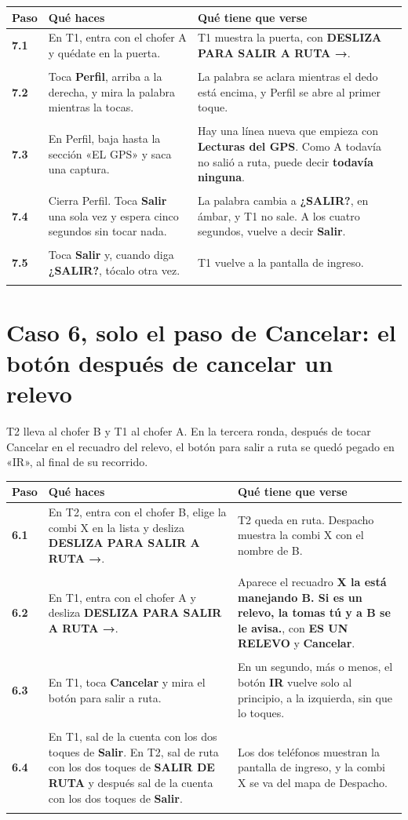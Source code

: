 \documentclass[10pt,a4paper]{article}
\makeatletter
\newcommand{\toca}[1]{\textcolor{azul}{\textbf{#1}}}
\newcommand{\pantalla}[1]{\textcolor{marron}{\textbf{#1}}}
\newcommand{\caja}[2]{\hbox{\vrule height #1 depth 0pt width 0pt #2}}
\newcommand{\campo}[3]{%
  \raisebox{-0.35\height}{\caja{#3}{\TextField[name=#1, width=#2, height=#3, charsize=8pt, bordercolor={0.55 0.6 0.68},
    backgroundcolor={0.965 0.976 0.992}, multiline=true]{}}}}
\newcommand{\resultado}[1]{%
  \caja{9pt}{\ChoiceMenu[radio, name=resultado-#1, width=9pt, height=9pt, radiosymbol=l,
    bordercolor={0.35 0.38 0.45}, default=]{}{OK=ok,FALLA=falla,NO SE PUDO=nopudo}}}
\newcommand{\paso}[4]{%
  \textbf{#1} & #3 & #4 \\*
  \multicolumn{3}{@{\hspace{6pt}}l@{}}{\rule{0pt}{15pt}\small
    \resultado{#2}\hspace{0.4em}Hora:~\campo{hora-#2}{1.7cm}{13pt}\hspace{1.2em}Nota:~\campo{nota-#2}{8.3cm}{22pt}}\\[3pt]
  \hline
}
\newenvironment{pasos}{%
  \begin{longtable}{@{\hspace{6pt}}>{\raggedright\arraybackslash}p{0.9cm}>{\raggedright\arraybackslash}p{7.9cm}>{\raggedright\arraybackslash}p{7.3cm}@{}}
  \rowcolor{cabecera}\textbf{Paso} & \textbf{Qué haces} & \textbf{Qué tiene que verse} \\ \hline
  \endhead
}{\end{longtable}\vspace{-0.6em}}
\makeatother
\begin{document}
\begin{Form}
\begin{pasos}
\paso{7.1}{7-1}{En T1, entra con el chofer A y quédate en la puerta.}{T1 muestra la puerta, con \pantalla{DESLIZA PARA SALIR A RUTA →}.}
\paso{7.2}{7-2}{Toca \toca{Perfil}, arriba a la derecha, y mira la palabra mientras la tocas.}{La palabra se aclara mientras el dedo está encima, y Perfil se abre al primer toque.}
\paso{7.3}{7-3}{En Perfil, baja hasta la sección «EL GPS» y saca una captura.}{Hay una línea nueva que empieza con \pantalla{Lecturas del GPS}. Como A todavía no salió a ruta, puede decir \pantalla{todavía ninguna}.}
\paso{7.4}{7-4}{Cierra Perfil. Toca \toca{Salir} una sola vez y espera cinco segundos sin tocar nada.}{La palabra cambia a \pantalla{¿SALIR?}, en ámbar, y T1 no sale. A los cuatro segundos, vuelve a decir \pantalla{Salir}.}
\paso{7.5}{7-5}{Toca \toca{Salir} y, cuando diga \pantalla{¿SALIR?}, tócalo otra vez.}{T1 vuelve a la pantalla de ingreso.}
\end{pasos}

\section{Caso 6, solo el paso de Cancelar: el botón después de cancelar un relevo}

T2 lleva al chofer B y T1 al chofer A. En la tercera ronda, después de tocar Cancelar en el recuadro del relevo, el botón para salir a ruta se quedó pegado en «IR», al final de su recorrido.

\begin{pasos}
\paso{6.1}{6-1}{En T2, entra con el chofer B, elige la combi X en la lista y desliza \toca{DESLIZA PARA SALIR A RUTA →}.}{T2 queda en ruta. Despacho muestra la combi X con el nombre de B.}
\paso{6.2}{6-2}{En T1, entra con el chofer A y desliza \toca{DESLIZA PARA SALIR A RUTA →}.}{Aparece el recuadro \pantalla{X la está manejando B. Si es un relevo, la tomas tú y a B se le avisa.}, con \pantalla{ES UN RELEVO} y \pantalla{Cancelar}.}
\paso{6.3}{6-3}{En T1, toca \toca{Cancelar} y mira el botón para salir a ruta.}{En un segundo, más o menos, el botón \pantalla{IR} vuelve solo al principio, a la izquierda, sin que lo toques.}
\paso{6.4}{6-4}{En T1, sal de la cuenta con los dos toques de \toca{Salir}. En T2, sal de ruta con los dos toques de \toca{SALIR DE RUTA} y después sal de la cuenta con los dos toques de \toca{Salir}.}{Los dos teléfonos muestran la pantalla de ingreso, y la combi X se va del mapa de Despacho.}
\end{pasos}


\end{Form}
\end{document}
